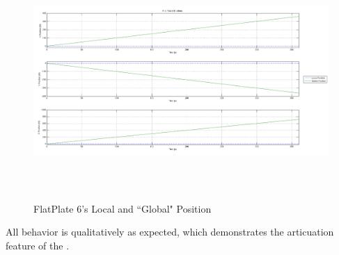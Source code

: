 \begin{description}
\begin{figure}[H]
\begin{center}
\includegraphics[height=90mm]{figs/art_test_3.png}
\caption{FlatPlate 6's Local and ``Global" Position}
\label{fig:artic_position_6}
\end{center}
\end{figure}

All behavior is qualitatively as expected, which demonstrates the articuation feature of
the \ModelDesc.

\end{description}

\label{test:art_test_1}

